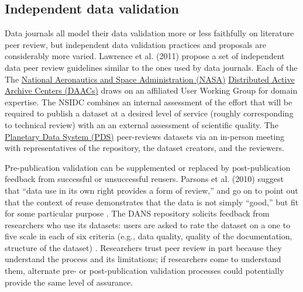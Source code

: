 \documentclass[10pt,a4paper,twocolumn]{article}
\begin{document}
{{\subsection*{Independent data validation}

Data journals all model their data validation more or less faithfully on literature peer review, but independent data validation practices and proposals are considerably more varied.
Lawrence et al. (2011) propose a set of independent data peer review guidelines similar to the ones used by data journals\cite{lawrence_citation_2011}.
Each of the The \href{http://www.nasa.gov/}{National Aeronautics and Space Administration (NASA)} \href{https://earthdata.nasa.gov/}{Distributed Active Archive Centers (DAACs)} draws on an affiliated User Working Group for domain expertise.
The NSIDC combines an internal assessment of the effort that will be required to publish a dataset at a desired level of service (roughly corresponding to technical review) with an an external assessment of scientific quality.
The \href{https://pds.jpl.nasa.gov/}{Planetary Data System (PDS)} peer-reviews datasets via an in-person meeting with representatives of the repository, the dataset creators, and the reviewers.  

Pre-publication validation can be supplemented or replaced by post-publication feedback from successful or unsuccessful reusers.
Parsons et al. (2010) suggest that ``data use in its own right provides a form of review,'' and go on to point out that the context of reuse demonstrates that the data is not simply ``good,'' but fit for some particular purpose \cite{parsons_data_2010}.
The DANS repository solicits feedback from researchers who use its datasets: users are asked to rate the dataset on a one to five scale in each of six criteria (e.g., data quality, quality of the documentation, structure of the dataset) \cite{grootveld_data_2011,grootveld_peer-reviewed_2012}.
Researchers trust peer review in part because they understand the process and its limitations; if researchers come to understand them, alternate pre- or post-publication validation processes could potentially provide the same level of assurance.

}}
\end{document}
